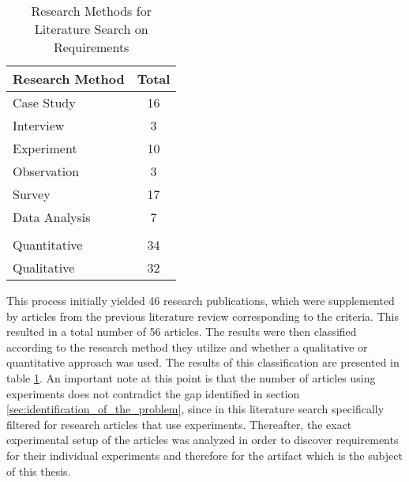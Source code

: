 \begin{table}[htbp]
    \centering
    \small
    \begin{tabular}{ll}
    \hline
    \multicolumn{1}{l}{Research Method} & \multicolumn{1}{l}{Total} \\ \hline
    \multicolumn{1}{l}{Case  Study}     & \multicolumn{1}{c}{16}    \\ 
    \multicolumn{1}{l}{Interview}       & \multicolumn{1}{c}{3}     \\ 
    \multicolumn{1}{l}{Experiment}      & \multicolumn{1}{c}{10}    \\ 
    \multicolumn{1}{l}{Observation}     & \multicolumn{1}{c}{3}     \\ 
    \multicolumn{1}{l}{Survey}          & \multicolumn{1}{c}{17}    \\ 
    \multicolumn{1}{l}{Data Analysis}   & \multicolumn{1}{c}{7}     \\ 
                                            &                            \\ \hline
    \multicolumn{1}{l}{Quantitative}    & \multicolumn{1}{c}{34}    \\ 
    \multicolumn{1}{l}{Qualitative}     & \multicolumn{1}{c}{32}    \\ \hline
    \end{tabular}
    \caption[Research Methods for Literature Search on Requirements]{Research Methods for Literature Search on Requirements}\label{tab:secondLiteratureSearch}
    \end{table}

This process initially yielded 46 research publications, which were supplemented by articles from the previous literature review corresponding to the criteria. This resulted in a total number of 56 articles. The results were then classified according to the research method they utilize and whether a qualitative or quantitative approach was used. The results of this classification are presented in table \ref{tab:secondLiteratureSearch}. An important note at this point is that the number of articles using experiments does not contradict the gap identified in section \ref{sec:identification_of_the_problem}, since in this literature search specifically filtered for research articles that use experiments. Thereafter, the exact experimental setup of the articles was analyzed in order to discover requirements for their individual experiments and therefore for the artifact which is the subject of this thesis.




